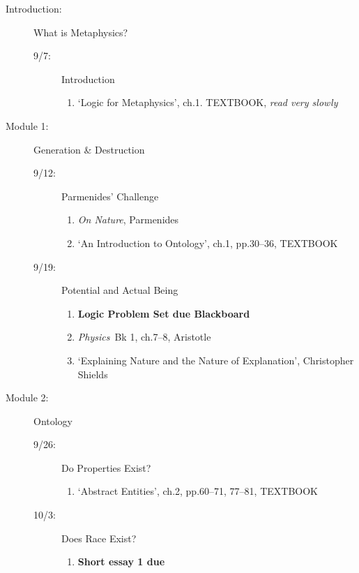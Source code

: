 \documentclass[article,oneside]{memoir}
\begin{document}
\begin{description}
\item[Introduction:]  What  is Metaphysics? 
\begin{description}
\item [9/7:] Introduction
\begin{enumerate}
\item `Logic for Metaphysics', ch.1. TEXTBOOK, \emph{read very slowly}
\end{enumerate}
\end{description}

\item[Module 1:] Generation \& Destruction
\begin{description}
\item [9/12:] Parmenides' Challenge
\begin{enumerate}
\item \emph{On Nature}, Parmenides
\item `An Introduction to Ontology', ch.1, pp.30--36, TEXTBOOK
\end{enumerate}

\item [9/19:] Potential and Actual Being 
\begin{enumerate}
\item \textbf{Logic Problem Set due Blackboard}
\item \emph{Physics}\ Bk 1, ch.7--8, Aristotle
\item `Explaining Nature and the Nature of Explanation', Christopher Shields

 
\end{enumerate}
\end{description}

\item[Module 2:] Ontology
\begin{description}

\item [9/26:] Do Properties Exist? 

\begin{enumerate}
\item `Abstract Entities', ch.2, pp.60--71, 77--81, TEXTBOOK
\end{enumerate}

\item[10/3: ] Does Race Exist? 

\begin{enumerate}
\item \textbf{Short essay 1 due}


\end{enumerate}
\end{description}
\end{description}
\end{document}
